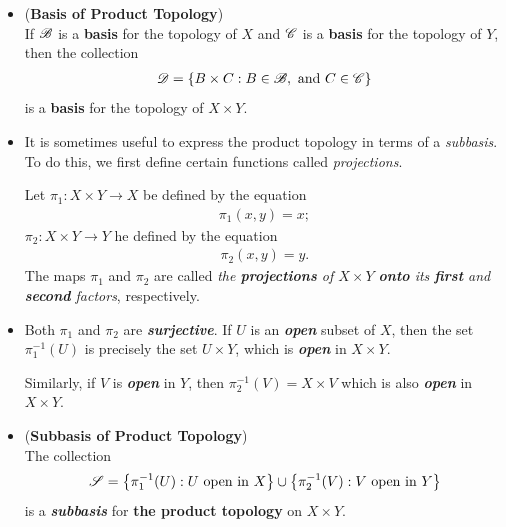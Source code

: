 \documentclass[11pt]{article}
\begin{document}
\begin{itemize}
\item \begin{proposition} (\textbf{Basis of Product Topology})\\
If ${\mathscr B}$ is a \textbf{basis} for the topology of $X$ and ${\mathscr C}$ is a \textbf{basis} for the topology of $Y$, then the collection
\begin{align*}
{\mathscr D} = \left\{B \times C: B \in {\mathscr B}, \text{ and } C \in {\mathscr C}\right\}
\end{align*}
is a \textbf{basis} for the topology of $X \times Y$.
\end{proposition}

\item It is sometimes useful to express the product topology in terms of a \emph{subbasis}. To do this, we first define certain functions called \emph{projections}.
\begin{definition}
Let $\pi_1 : X \times Y \rightarrow X$ be defined by the equation
\begin{align*}
\pi_1 (x, y) = x;
\end{align*}
$\pi_2 : X \times Y \rightarrow Y$ he defined by the equation
\begin{align*}
\pi_2 (x, y) = y.
\end{align*}
The maps $\pi_1$ and $\pi_2$ are called \emph{the \textbf{projections} of $X \times Y$ \textbf{onto} its \textbf{first} and \textbf{second} factors}, respectively.
\end{definition} 

\item \begin{remark}
Both $\pi_1$ and $\pi_2$ are \emph{\textbf{surjective}}. If $U$ is an \emph{\textbf{open}} subset of $X$, then the set $\pi_1^{-1}(U)$ is precisely the set $U \times Y$, which
is \emph{\textbf{open}} in $X \times Y$. 

Similarly, if $V$ is \emph{\textbf{open}} in $Y$, then $\pi_2^{-1}(V) = X \times V$ which is also \emph{\textbf{open}} in $X \times Y$.
\end{remark}

\item \begin{proposition}  (\textbf{Subbasis of Product Topology})\\
The collection
\begin{align*}
{\mathscr S} = \left\{\pi_1^{-1}(U): U\text{ open in }X\right\} \cup \left\{\pi_2^{-1}(V): V\text{ open in }Y\right\}
\end{align*}
is a \emph{\textbf{subbasis}} for \textbf{the product topology} on $X \times Y$.
\end{proposition}
\end{itemize}
\end{document}
